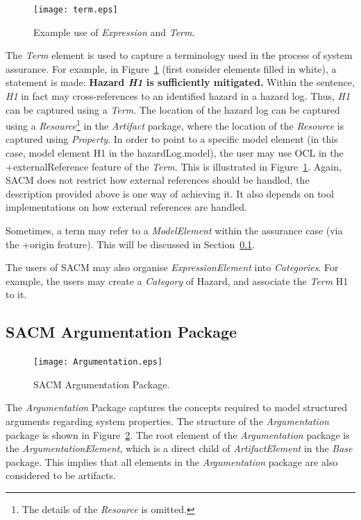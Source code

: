 \begin{figure}
	\centering
	\texttt{[image: term.eps]}
	\caption{Example use of \textit{Expression} and \textit{Term}.}
	\label{fig:termExample}
\end{figure}

The \textit{Term} element is used to capture a terminology used in the process of system assurance. 
For example, in Figure~\ref{fig:termExample} (first consider elements filled in white), a statement is made: \textbf{Hazard \textit{H1} is sufficiently mitigated.} 
Within the sentence, \textit{H1} in fact may cross-references to an identified hazard in a hazard log. 
Thus, \textit{H1} can be captured using a \textit{Term}. 
The location of the hazard log can be captured using a \textit{Resource}\footnote{The details of the \textit{Resource} is omitted.} in the \textit{Artifact} package, where the location of the \textit{Resource} is captured using \textit{Property}. 
In order to point to a specific model element (in this case, model element H1 in the hazardLog.model), the user may use OCL in the +externalReference feature of the \textit{Term}. 
This is illustrated in Figure~\ref{fig:termExample}.
Again, SACM does not restrict how external references should be handled, the description provided above is one way of achieving it. 
It also depends on tool implementations on how external references are handled. 

Sometimes, a term may refer to a \textit{ModelElement} within the assurance case (via the +origin feature). 
This will be discussed in Section~\ref{sec:argPack}.

The users of SACM may also organise \textit{ExpressionElement} into \textit{Categories}. 
For example, the users may create a \textit{Category} of Hazard, and associate the \textit{Term} H1 to it. 
\subsection{SACM Argumentation Package}
\label{sec:argPack}
\begin{figure}
	\centering
	\texttt{[image: Argumentation.eps]}
	\caption{SACM Argumentation Package.}
	\label{fig:arg}
\end{figure}
The \textit{Argumentation} Package captures the concepts required to model structured arguments regarding system properties. 
The structure of the \textit{Argumentation} package is shown in Figure~\ref{fig:arg}.
The root element of the \textit{Argumentation} package is the \textit{ArgumentationElement}, which is a direct child of \textit{ArtifactElement} in the \textit{Base} package. 
This implies that all elements in the \textit{Argumentation} package are also considered to be artifacts. 

